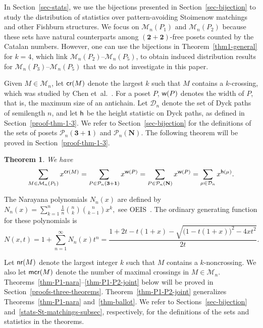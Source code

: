 \documentclass[11pt]{article}
\DeclareMathOperator{\crr}{\mbox{\sf{cr}}}
\DeclareMathOperator{\nr}{\mbox{\sf{nr}}}
\DeclareMathOperator{\mcr}{\mbox{\sf{mcr}}}
\DeclareMathOperator{\wid}{\mbox{\sf{w}}}
\newtheorem{thm}{Theorem}[section]
\newcommand{\PP}{{\mathcal P}}
\newcommand{\D}{\mathcal{D}}
\newcommand{\M}{\mathcal{M}}
\begin{document}
	In Section~\ref{sec-stats}, we use the bijections presented in Section~\ref{sec-bijection} to study the distribution of statistics over pattern-avoiding Stoimenow matchings and other Fishburn structures. We focus on $\M_n(P_1)$ and $\M_n(P_2)$ because these sets have natural counterparts among $\mathbf{(2+2)}$-free posets counted by the Catalan numbers. However, one can use the bijections in Theorem~\ref{thm1-general} for $k=4$, which link $\M_n(P_2)$--$\M_n(P_5)$, to obtain induced distribution results for $\M_n(P_3)$--$\M_n(P_5)$ that we do not investigate in this paper.
	
	Given $M \in \mathcal{M}_n$, let $\crr(M)$ denote the largest $k$ such that $M$ contains a $k$-crossing, 
	which was studied by Chen et~al.~\cite{Chen-Deng-Du-Stanley-Yan}. 
	For a poset $P$, $\wid(P)$ denotes the width of $P$, that is, the maximum size of an antichain.  Let $\mathcal{D}_n$ denote the set of Dyck paths of semilength $n$, and let $\mbox{\sf{h}}$ be the height statistic on Dyck paths, 
	as defined in Section~\ref{proof-thm-1-3}. 
	We refer to Section~\ref{sec-bijection} for the definitions of the sets of posets $\PP_n\mathbf{(3+1)}$ and $\PP_n\mathbf{(N)}$. 
	The following theorem will be proved in Section~\ref{proof-thm-1-3}.
	
	\begin{thm}\label{thm-equi-cr-nr-P1}
		We have
		\begin{align}\label{sta-cr-nr-P1}
			\sum_{M \in \M_n(P_1)} x^{\mbox{\sf{\footnotesize cr}}(M)}= \sum_{P\in \mathcal{P}_n{\bf (3+1)}} x^{\mbox{\sf{\footnotesize w}}(P)}= \sum_{P\in \mathcal{P}_n{\bf (N)}} x^{\mbox{\sf{\footnotesize w}}(P)} =\sum_{\mu \in \D_n} x^{\mbox{\sf{\footnotesize h}}(\mu)}.
		\end{align}
	\end{thm}
	
	The Narayana polynomials $N_n(x)$ are  defined by  
	\(
	N_n(x) = \sum_{k=1}^{n} \frac{1}{n} \binom{n}{k} \binom{n}{k-1} x^k,
	\)
	see OEIS~\cite[A001263]{OEIS}.
	The ordinary generating function for these polynomials  is
	\begin{equation}\label{Narayana-formula}
		N(x,t) =1+ \sum_{n=1}^{\infty} N_n(x) t^n= \frac{1+2t-t(1+x)-\sqrt{\bigl(1-t(1+x)\bigr)^{2}-4xt^{2}}}{2t}.
	\end{equation}
	
	Let $\nr(M)$ denote the largest integer $k$ such that $M$ contains a \( k \)-noncrossing.
	We also let $\mcr(M)$ denote the number of maximal crossings in $M\in\M_n$. 
	Theorems~\ref{thm-P1-nara}--\ref{thm-P1-P2-joint} below will be proved in Section~\ref{proofs-three-theorems}. 
	Theorem~\ref{thm-P1-P2-joint} generalizes Theorems~\ref{thm-P1-nara} and~\ref{thm-ballot}. 
	We refer to Sections~\ref{sec-bijection} and~\ref{stats-St-matchings-subsec}, respectively, for the definitions of the sets and statistics in the theorems.
	
\end{document}
